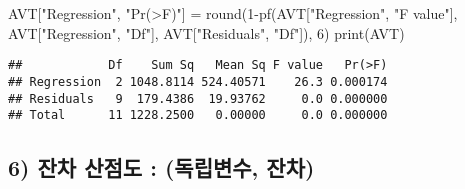 \documentclass[
]{article}
\newenvironment{Shaded}{\begin{snugshade}}{\end{snugshade}}
\newcommand{\DecValTok}[1]{\textcolor[rgb]{0.00,0.00,0.81}{#1}}
\newcommand{\FunctionTok}[1]{\textcolor[rgb]{0.00,0.00,0.00}{#1}}
\newcommand{\NormalTok}[1]{#1}
\newcommand{\OtherTok}[1]{\textcolor[rgb]{0.56,0.35,0.01}{#1}}
\newcommand{\SpecialCharTok}[1]{\textcolor[rgb]{0.00,0.00,0.00}{#1}}
\newcommand{\StringTok}[1]{\textcolor[rgb]{0.31,0.60,0.02}{#1}}
\begin{document}
\begin{Shaded}
\begin{Highlighting}[]
\NormalTok{AVT[}\StringTok{"Regression"}\NormalTok{, }\StringTok{"Pr(\textgreater{}F)"}\NormalTok{] }\OtherTok{=} \FunctionTok{round}\NormalTok{(}\DecValTok{1}\SpecialCharTok{{-}}\FunctionTok{pf}\NormalTok{(AVT[}\StringTok{"Regression"}\NormalTok{, }\StringTok{"F value"}\NormalTok{], }
\NormalTok{                                         AVT[}\StringTok{"Regression"}\NormalTok{, }\StringTok{"Df"}\NormalTok{], }
\NormalTok{                                         AVT[}\StringTok{"Residuals"}\NormalTok{, }\StringTok{"Df"}\NormalTok{]), }\DecValTok{6}\NormalTok{)}
\FunctionTok{print}\NormalTok{(AVT)}
\end{Highlighting}
\end{Shaded}

\begin{verbatim}
##            Df    Sum Sq   Mean Sq F value   Pr(>F)
## Regression  2 1048.8114 524.40571    26.3 0.000174
## Residuals   9  179.4386  19.93762     0.0 0.000000
## Total      11 1228.2500   0.00000     0.0 0.000000
\end{verbatim}

\hypertarget{uxc794uxcc28-uxc0b0uxc810uxb3c4-uxb3c5uxb9bduxbcc0uxc218-uxc794uxcc28}{%
\subsection{6) 잔차 산점도 : (독립변수,
잔차)}\label{uxc794uxcc28-uxc0b0uxc810uxb3c4-uxb3c5uxb9bduxbcc0uxc218-uxc794uxcc28}}
\end{document}
